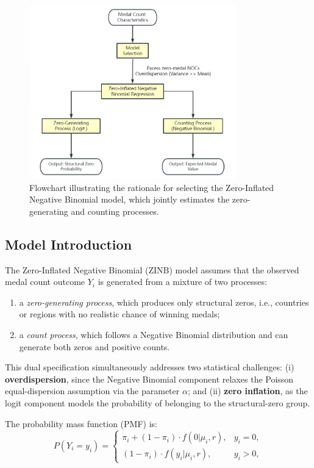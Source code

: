 \documentclass[11pt,twoside]{article}
\numberwithin{Theorem}{section}
\numberwithin{Definition}{section}
\numberwithin{Lemma}{section}
\numberwithin{Algorithm}{section}
\numberwithin{equation}{section}
\begin{document}
\begin{figure}[H]
\centering
\includegraphics[width=0.8\textwidth]{flow chart.png}
\caption{Flowchart illustrating the rationale for selecting the Zero-Inflated Negative Binomial model, which jointly estimates the zero-generating and counting processes.}
\label{fig:model_selection}
\end{figure}


\subsection{Model Introduction}
\label{subsec:model_introduction}

The Zero-Inflated Negative Binomial (ZINB) model assumes that the observed medal count outcome $Y_i$ is generated from a mixture of two processes:  
\begin{enumerate}
    \item a \emph{zero-generating process}, which produces only structural zeros, i.e., countries or regions with no realistic chance of winning medals;  
    \item a \emph{count process}, which follows a Negative Binomial distribution and can generate both zeros and positive counts.  
\end{enumerate}

This dual specification simultaneously addresses two statistical challenges:  
(i) \textbf{overdispersion}, since the Negative Binomial component relaxes the Poisson equal-dispersion assumption via the parameter $\alpha$; and  
(ii) \textbf{zero inflation}, as the logit component models the probability of belonging to the structural-zero group.  

The probability mass function (PMF) is:  
\begin{equation}
P(Y_i = y_i) =
\begin{cases}
\pi_i + (1-\pi_i)\cdot f(0|\mu_i,r), & y_i = 0, \\
(1-\pi_i)\cdot f(y_i|\mu_i,r), & y_i > 0,
\end{cases}
\label{eq:zinb_pmf}
\end{equation}
\end{document}
